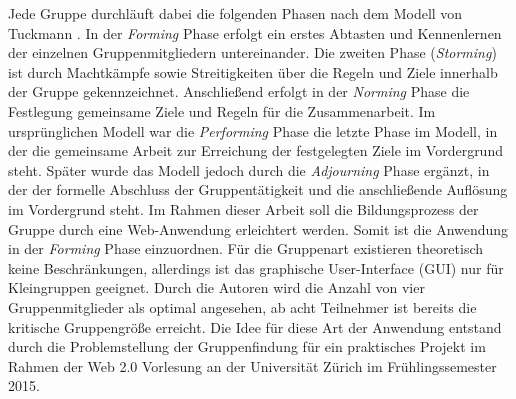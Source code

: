 \newline\newline
Jede Gruppe durchläuft dabei die folgenden Phasen nach dem Modell von Tuckmann \citep[Vgl.][S.~26-28]{dick_teamwork_2013}. In der \emph{Forming} Phase erfolgt ein erstes Abtasten und Kennenlernen der einzelnen Gruppenmitgliedern untereinander. Die zweiten Phase (\emph{Storming}) ist durch Machtkämpfe sowie Streitigkeiten über die Regeln und Ziele innerhalb der Gruppe gekennzeichnet. Anschließend erfolgt in der \emph{Norming} Phase die Festlegung gemeinsame Ziele und Regeln für die Zusammenarbeit. Im ursprünglichen Modell war die \emph{Performing} Phase die letzte Phase im Modell, in der die gemeinsame Arbeit zur Erreichung der festgelegten Ziele im Vordergrund steht. Später wurde das Modell jedoch durch die \emph{Adjourning} Phase ergänzt, in der der formelle Abschluss der Gruppentätigkeit und die anschließende Auflösung im Vordergrund steht.
\newline\newline
Im Rahmen dieser Arbeit soll die Bildungsprozess der Gruppe durch eine Web-Anwendung erleichtert werden. Somit ist die Anwendung in der \emph{Forming} Phase einzuordnen. Für die Gruppenart existieren theoretisch keine Beschränkungen, allerdings ist das graphische User-Interface (GUI) nur für Kleingruppen geeignet. Durch die Autoren wird die Anzahl von vier Gruppenmitglieder als optimal angesehen, ab acht Teilnehmer ist bereits die kritische Gruppengröße erreicht. Die Idee für diese Art der Anwendung entstand durch die Problemstellung der Gruppenfindung für ein praktisches Projekt im Rahmen der Web 2.0 Vorlesung an der Universität Zürich im Frühlingssemester 2015.
